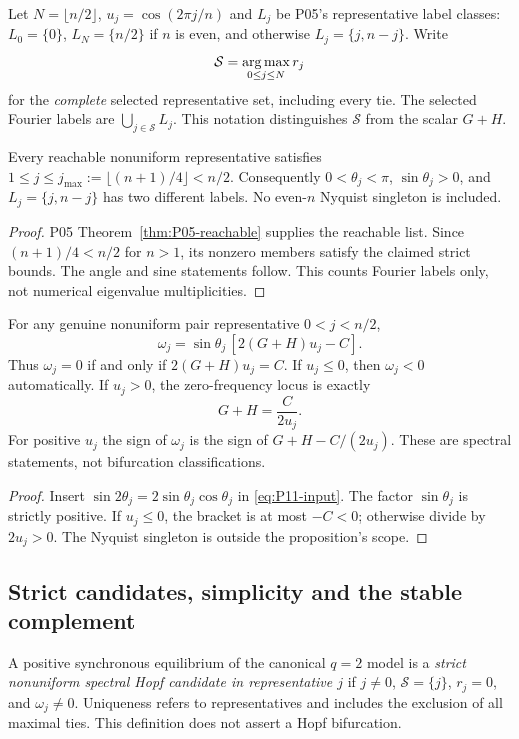 Let $N=\lfloor n/2\rfloor$, $u_j=\cos(2\pi j/n)$ and
$L_j$ be P05's representative label classes: $L_0=\{0\}$,
$L_N=\{n/2\}$ if $n$ is even, and otherwise
$L_j=\{j,n-j\}$. Write
\[
 \mathcal S=\operatorname*{arg\,max}_{0\le j\le N}r_j
\]
for the \emph{complete} selected representative set, including every tie.
The selected Fourier labels are $\bigcup_{j\in\mathcal S}L_j$.
This notation distinguishes $\mathcal S$ from the scalar $G+H$.

\begin{lemma}
\label{lem:P11-pairs}
Every reachable nonuniform representative satisfies
$1\le j\le j_{\max}:=\lfloor(n+1)/4\rfloor<n/2$.
Consequently $0<\theta_j<\pi$, $\sin\theta_j>0$, and
$L_j=\{j,n-j\}$ has two different labels. No even-$n$ Nyquist
singleton is included.
\end{lemma}
\begin{proof}
P05 Theorem~\ref{thm:P05-reachable} supplies the reachable list.
Since $(n+1)/4<n/2$ for $n>1$, its nonzero members satisfy the
claimed strict bounds. The angle and sine statements follow.
This counts Fourier labels only, not numerical eigenvalue multiplicities.
\end{proof}

\begin{proposition}
\label{prop:P11-frequency}
For any genuine nonuniform pair representative $0<j<n/2$,
\begin{equation}
 \boxed{\omega_j=\sin\theta_j\,[2(G+H)u_j-C].}
 \label{eq:P11-frequency}
\end{equation}
Thus $\omega_j=0$ if and only if $2(G+H)u_j=C$.
If $u_j\le0$, then $\omega_j<0$ automatically. If $u_j>0$,
the zero-frequency locus is exactly
\begin{equation}
 G+H=\frac{C}{2u_j}.
 \label{eq:P11-zero-frequency}
\end{equation}
For positive $u_j$ the sign of $\omega_j$ is the sign of
$G+H-C/(2u_j)$. These are spectral statements, not bifurcation classifications.
\end{proposition}
\begin{proof}
Insert $\sin2\theta_j=2\sin\theta_j\cos\theta_j$ in
\eqref{eq:P11-input}. The factor $\sin\theta_j$ is strictly positive.
If $u_j\le0$, the bracket is at most $-C<0$; otherwise divide by
$2u_j>0$. The Nyquist singleton is outside the proposition's scope.
\end{proof}

\subsection{Strict candidates, simplicity and the stable complement}
\label{slot:P11-2}
\begin{definition}
\label{def:P11-candidate}
A positive synchronous equilibrium of the canonical $q=2$ model is a
\emph{strict nonuniform spectral Hopf candidate in representative $j$}
if $j\ne0$, $\mathcal S=\{j\}$, $r_j=0$, and $\omega_j\ne0$.
Uniqueness refers to representatives and includes the exclusion of all
maximal ties. This definition does not assert a Hopf bifurcation.
\end{definition}

